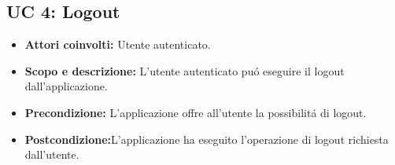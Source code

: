 \subsection{UC 4: Logout}
		
\begin{itemize}
		\item \textbf{Attori coinvolti:} Utente autenticato. \\
		\item \textbf{Scopo e descrizione:} L'utente autenticato pu\'o eseguire il logout dall’applicazione. \\
		\item \textbf{Precondizione:} L'applicazione offre all'utente la possibilit\'a di logout. \\
		\item \textbf{Postcondizione:}L'applicazione ha eseguito l'operazione di logout richiesta dall’utente. \\
\end{itemize}